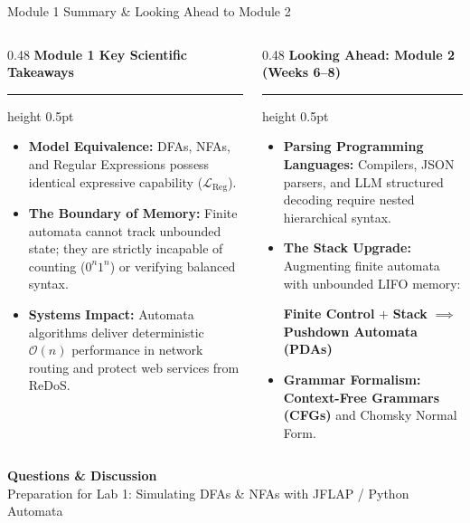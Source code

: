 \documentclass[aspectratio=169, 10pt]{beamer}
\newcommand{\colheader}[1]{%
  {\noindent\footnotesize\bfseries\color{gimpanavy}#1}%
  \vspace{0.03cm}%
  {\color{gimpanavy!30}\hrule height 0.5pt}%
  \vspace{0.08cm}%
}
\begin{document}
\begin{frame}{Module 1 Summary \& Looking Ahead to Module 2}
  \begin{columns}[T]
    \begin{column}{0.48\textwidth}
      \colheader{Module 1 Key Scientific Takeaways}
      \begin{tcolorbox}[conceptcard]
        \begin{itemize}\setlength{\itemsep}{3.5pt}\scriptsize
          \item \textbf{Model Equivalence:} DFAs, NFAs, and Regular Expressions possess identical expressive capability ($\mathcal{L}_{\text{Reg}}$).
          \item \textbf{The Boundary of Memory:} Finite automata cannot track unbounded state; they are strictly incapable of counting ($0^n 1^n$) or verifying balanced syntax.
          \item \textbf{Systems Impact:} Automata algorithms deliver deterministic $\mathcal{O}(n)$ performance in network routing and protect web services from ReDoS.
        \end{itemize}
      \end{tcolorbox}
    \end{column}

    \hfill

    \begin{column}{0.48\textwidth}
      \colheader{Looking Ahead: Module 2 (Weeks 6--8)}
      \begin{tcolorbox}[spotlightcard]
        \begin{itemize}\setlength{\itemsep}{3.5pt}\scriptsize
          \item \textbf{Parsing Programming Languages:} Compilers, JSON parsers, and LLM structured decoding require nested hierarchical syntax.
          \item \textbf{The Stack Upgrade:} Augmenting finite automata with unbounded LIFO memory:
            \begin{center}
              \textbf{Finite Control} $+$ \textbf{Stack} $\implies$ \textbf{Pushdown Automata (PDAs)}
            \end{center}
          \item \textbf{Grammar Formalism:} \textbf{Context-Free Grammars (CFGs)} and Chomsky Normal Form.
        \end{itemize}
      \end{tcolorbox}
    \end{column}
  \end{columns}

  \vspace{0.25cm}
  \begin{center}
    {\normalsize\bfseries\color{gimpanavy} Questions \& Discussion}\\[0.05cm]
    {\footnotesize\color{gimpaslate} Preparation for Lab 1: Simulating DFAs \& NFAs with JFLAP / Python Automata}
  \end{center}
\end{frame}
\end{document}
